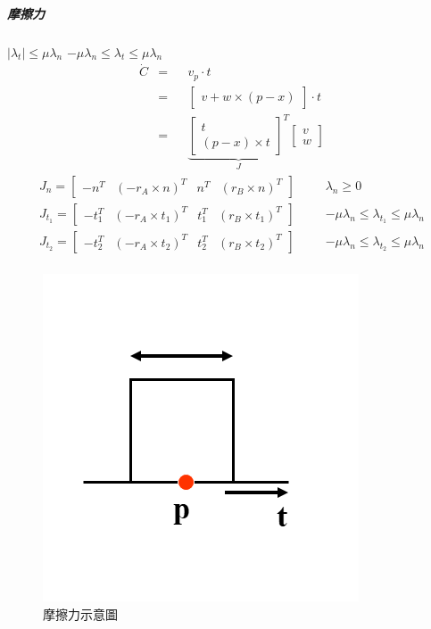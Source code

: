 \subparagraph{摩擦力}

\begin{itemize}
            $|\lambda_t|\leq\mu\lambda_n$
            $-\mu\lambda_n\leq\lambda_t\leq\mu\lambda_n$
        \begin{equation}
            \begin{aligned}
                \dot{C} &=&& v_p \cdot t \\
                        &=&& \begin{bmatrix}v+w\times(p-x)\end{bmatrix}\cdot t \\
                        &=&& \underbrace{\begin{bmatrix}t\\(p-x)\times t\end{bmatrix}^T}_J \begin{bmatrix}v\\w\end{bmatrix}
            \end{aligned}
        \end{equation}
        \begin{equation}
            \begin{aligned}
                J_n=\begin{bmatrix}-n^T & (-r_A\times n)^T & n^T & (r_B\times n)^T\end{bmatrix}             &&& \lambda_n\geq0 \\
                J_{t_1}=\begin{bmatrix}-t_1^T & (-r_A\times t_1)^T & t_1^T & (r_B\times t_1)^T\end{bmatrix} &&& -\mu\lambda_n\leq\lambda_{t_1}\leq\mu\lambda_n \\
                J_{t_2}=\begin{bmatrix}-t_2^T & (-r_A\times t_2)^T & t_2^T & (r_B\times t_2)^T\end{bmatrix} &&& -\mu\lambda_n\leq\lambda_{t_2}\leq\mu\lambda_n \\
            \end{aligned}
        \end{equation}
    
\end{itemize}

\begin{figure}[h]
    \begin{center}
        \includegraphics[width=0.3\linewidth]{./resources/physics/pt.png}
    \end{center}
    \caption{摩擦力示意圖}
    \label{Friction}
\end{figure}

